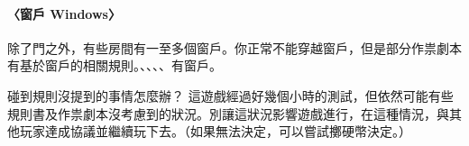 \paragraph{〈窗戶 Windows〉}
除了門之外，有些房間有一至多個窗戶。你正常不能穿越窗戶，但是部分作祟劇本有基於窗戶的相關規則。、、、、有窗戶。

\begin{RuleBox}{碰到規則沒提到的事情怎麼辦？}
  這遊戲經過好幾個小時的測試，但依然可能有些規則書及作祟劇本沒考慮到的狀況。別讓這狀況影響遊戲進行，在這種情況，與其他玩家達成協議並繼續玩下去。（如果無法決定，可以嘗試擲硬幣決定。）
\end{RuleBox}
